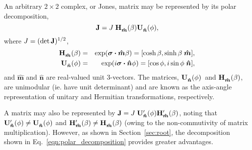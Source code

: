 \documentclass[12pt]{article}
\newcommand\boost[1]{\ensuremath{ {\bf H}^{#1}_{\bm{\hat m}}(\beta) }}
\newcommand\rotat[1]{\ensuremath{ {\bf U}^{#1}_{\bm{\hat n}}(\phi) }}
\begin{document}
An arbitrary $2\times2$ complex, or Jones, matrix may be represented
by its polar decomposition,
\begin{equation}
{\bf J} = J \; \boost{} \rotat{},
\label{eqn:polar_decomposition}
\end{equation}
where $J=(\det{\bf J})^{1/2}$,
\begin{eqnarray}
\boost{} &=& \exp(\bm{\sigma\cdot}\bm{\hat m}\beta)
        = [\cosh\beta,\sinh\beta\;\bm{\hat m}],
\label{eqn:boost} \\
\rotat{} &=& \exp(i\bm{\sigma\cdot}\bm{\hat n}\phi)
        = [\cos\phi,i\sin\phi\;\bm{\hat n}],
\label{eqn:rotation}
\end{eqnarray}
and $\bm{\hat m}$ and $\bm{\hat n}$ are real-valued unit 3-vectors.
The matrices, \rotat{}\ and \boost{}, are unimodular (ie. have unit
determinant) and are known as the axis-angle representation of unitary
and Hermitian transformations, respectively.

A matrix may also be represented by ${\bf J} = J \; \rotat{\prime}
\boost{\prime}$, noting that $\rotat{\prime}\ne\rotat{}$ and
$\boost{\prime}\ne\boost{}$ (owing to the non-commutivity of matrix
multiplication).  However, as shown in Section~\ref{sec:root}, the
decomposition shown in Eq.~\ref{eqn:polar_decomposition} provides greater
advantages.
\end{document}
